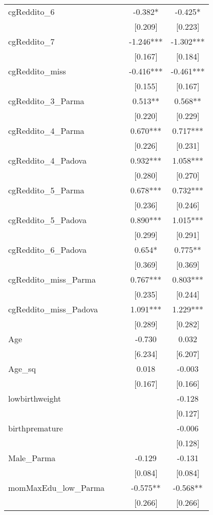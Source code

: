 \documentclass[]{article}
\begin{document}
\begin{tabular}{lcccc}
cgReddito\_6 &  &  & -0.382* & -0.425* \\
 &  &  & [0.209] & [0.223] \\
cgReddito\_7 &  &  & -1.246*** & -1.302*** \\
 &  &  & [0.167] & [0.184] \\
cgReddito\_miss &  &  & -0.416*** & -0.461*** \\
 &  &  & [0.155] & [0.167] \\
cgReddito\_3\_Parma &  &  & 0.513** & 0.568** \\
 &  &  & [0.220] & [0.229] \\
cgReddito\_4\_Parma &  &  & 0.670*** & 0.717*** \\
 &  &  & [0.226] & [0.231] \\
cgReddito\_4\_Padova &  &  & 0.932*** & 1.058*** \\
 &  &  & [0.280] & [0.270] \\
cgReddito\_5\_Parma &  &  & 0.678*** & 0.732*** \\
 &  &  & [0.236] & [0.246] \\
cgReddito\_5\_Padova &  &  & 0.890*** & 1.015*** \\
 &  &  & [0.299] & [0.291] \\
cgReddito\_6\_Padova &  &  & 0.654* & 0.775** \\
 &  &  & [0.369] & [0.369] \\
cgReddito\_miss\_Parma &  &  & 0.767*** & 0.803*** \\
 &  &  & [0.235] & [0.244] \\
cgReddito\_miss\_Padova &  &  & 1.091*** & 1.229*** \\
 &  &  & [0.289] & [0.282] \\
Age &  &  & -0.730 & 0.032 \\
 &  &  & [6.234] & [6.207] \\
Age\_sq &  &  & 0.018 & -0.003 \\
 &  &  & [0.167] & [0.166] \\
lowbirthweight &  &  &  & -0.128 \\
 &  &  &  & [0.127] \\
birthpremature &  &  &  & -0.006 \\
 &  &  &  & [0.128] \\
Male\_Parma &  &  & -0.129 & -0.131 \\
 &  &  & [0.084] & [0.084] \\
momMaxEdu\_low\_Parma &  &  & -0.575** & -0.568** \\
 &  &  & [0.266] & [0.266] \\

\end{tabular}
\end{document}
